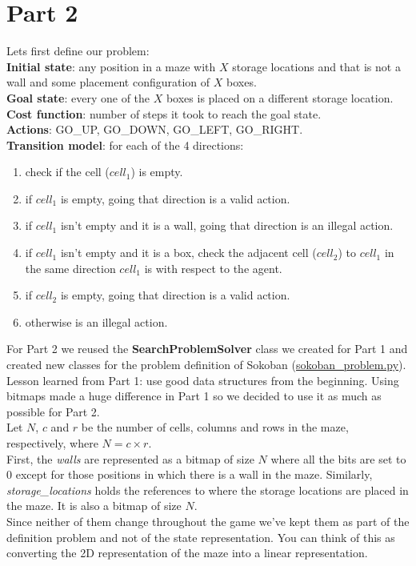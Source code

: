 \documentclass[11pt]{article}
\begin{document}
\pagebreak
\section*{Part 2}
Lets first define our problem:\\
\textbf{Initial state}: any position in a maze with $X$ storage locations and that is not a wall and some placement configuration of $X$ boxes. \\
\textbf{Goal state}: every one of the $X$ boxes is placed on a different storage location.\\
\textbf{Cost function}: number of steps it took to reach the goal state.\\
\textbf{Actions}: GO\_UP, GO\_DOWN, GO\_LEFT, GO\_RIGHT.\\
\textbf{Transition model}: for each of the 4 directions:
\begin{enumerate}
\item check if the cell ($cell_1$) is empty.
\item if $cell_1$ is empty, going that direction is a valid action.
\item if $cell_1$ isn't empty and it is a wall, going that direction is an illegal action.
\item if $cell_1$ isn't empty and it is a box, check the adjacent cell ($cell_2$) to $cell_1$ in the same direction $cell_1$ is with respect to the agent. 
\item if $cell_2$ is empty, going that direction is a valid action.
\item otherwise is an illegal action.
\end{enumerate}

For Part 2 we reused the \textbf{SearchProblemSolver} class we created for Part 1 and created new classes for the problem definition of Sokoban (\href{https://github.com/nbermudezs/UIUC_CS440/tree/master/assignment1/part2/sokoban\_problem.py}{sokoban\_problem.py}).\\

Lesson learned from Part 1: use good data structures from the beginning. Using bitmaps made a huge difference in Part 1 so we decided to use it as much as possible for Part 2.\\

Let $N$, $c$ and $r$ be the number of cells, columns and rows in the maze, respectively, where $N = c\times r$.\\
First, the \textit{walls} are represented as a bitmap of size $N$ where all the bits are set to 0 except for those positions in which there is a wall in the maze. Similarly, \textit{storage\_locations} holds the references to where the storage locations are placed in the maze. It is also a bitmap of size $N$.\\
Since neither of them change throughout the game we've kept them as part of the definition problem and not of the state representation. You can think of this as converting the 2D representation of the maze into a linear representation.\\
\end{document}

